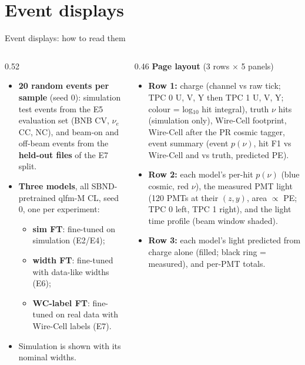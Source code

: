 \documentclass[aspectratio=169,10pt]{beamer}
\begin{document}
\section{Event displays}
\begin{frame}{Event displays: how to read them}
  \footnotesize
  \begin{columns}[T]
    \begin{column}{0.52\textwidth}
      \begin{itemize}\setlength{\itemsep}{3pt}
        \item \textbf{20 random events per sample} (seed 0): simulation test events from the E5 evaluation set (BNB CV, $\nu_e$CC, NC),
          and beam-on and off-beam events from the \textbf{held-out files} of the E7 split.
        \item \textbf{Three models}, all SBND-pretrained qlfm-M CL, seed 0, one per experiment:
          \begin{itemize}
            \item \textcolor[HTML]{d23f3f}{\textbf{sim FT}}: fine-tuned on simulation (E2/E4);
            \item \textcolor[HTML]{2a78d6}{\textbf{width FT}}: fine-tuned with data-like widths (E6);
            \item \textcolor[HTML]{3b9b54}{\textbf{WC-label FT}}: fine-tuned on real data with Wire-Cell labels (E7).
          \end{itemize}
        \item Simulation is shown with its nominal widths.
      \end{itemize}
    \end{column}
    \begin{column}{0.46\textwidth}
      \textbf{Page layout} (3 rows $\times$ 5 panels)
      \begin{itemize}\setlength{\itemsep}{3pt}
        \item \textbf{Row 1:} charge (channel vs raw tick; TPC 0 U, V, Y then TPC 1 U, V, Y; colour = log$_{10}$ hit integral),
          truth $\nu$ hits (simulation only), Wire-Cell footprint, Wire-Cell after the PR cosmic tagger, event summary
          (event $p(\nu)$, hit F1 vs Wire-Cell and vs truth, predicted PE).
        \item \textbf{Row 2:} each model's per-hit $p(\nu)$ (blue cosmic, red $\nu$), the measured PMT light (120 PMTs at their
          $(z, y)$, area $\propto$ PE; TPC 0 left, TPC 1 right), and the light time profile (beam window shaded).
        \item \textbf{Row 3:} each model's light predicted from charge alone (filled; black ring = measured), and per-PMT totals.
      \end{itemize}
    \end{column}
  \end{columns}
\end{frame}
\end{document}

